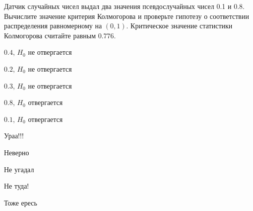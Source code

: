 
\begin{question}
Датчик случайных чисел выдал два значения псевдослучайных чисел 0.1 и
0.8. Вычислите значение критерия Колмогорова и проверьте гипотезу о
соответствии распределения равномерному на \((0,1)\). Критическое
значение статистики Колмогорова считайте равным \(0.776\).
\begin{answerlist}
  \item \(0.4\), \(H_0\) не отвергается
  \item \(0.2\), \(H_0\) не отвергается
  \item \(0.3\), \(H_0\) не отвергается
  \item \(0.8\), \(H_0\) отвергается
  \item \(0.1\), \(H_0\) отвергается
\end{answerlist}
\end{question}

\begin{solution}
\begin{answerlist}
  \item Ураа!!!
  \item Неверно
  \item Не угадал
  \item Не туда!
  \item Тоже ересь
\end{answerlist}
\end{solution}

